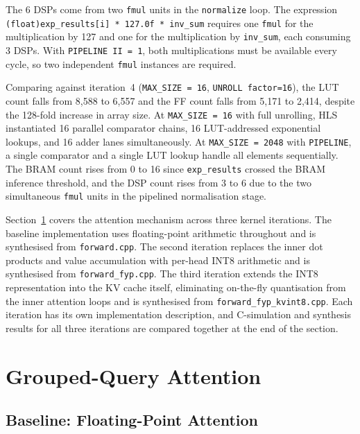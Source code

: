 The 6 DSPs come from two \texttt{fmul} units in the \texttt{normalize}
loop. The expression \texttt{(float)exp\_results[i] * 127.0f * inv\_sum}
requires one \texttt{fmul} for the multiplication by 127 and one for the
multiplication by \texttt{inv\_sum}, each consuming 3 DSPs. With
\texttt{PIPELINE II\,=\,1}, both multiplications must be available every
cycle, so two independent \texttt{fmul} instances are required.

Comparing against iteration~4 (\texttt{MAX\_SIZE\,=\,16}, \texttt{UNROLL
factor=16}), the LUT count falls from 8{,}588 to 6{,}557 and the FF
count falls from 5{,}171 to 2{,}414, despite the 128-fold increase in
array size. At \texttt{MAX\_SIZE\,=\,16} with full unrolling, HLS
instantiated 16 parallel comparator chains, 16 LUT-addressed
exponential lookups, and 16 adder lanes simultaneously. At
\texttt{MAX\_SIZE\,=\,2048} with \texttt{PIPELINE}, a single
comparator and a single LUT lookup handle all elements sequentially.
The BRAM count rises from 0 to 16 since \texttt{exp\_results} crossed
the BRAM inference threshold, and the DSP count rises from 3 to 6 due
to the two simultaneous \texttt{fmul} units in the pipelined
normalisation stage.



Section~\ref{sec:attn_impl} covers the attention mechanism across three
kernel iterations. The baseline implementation uses floating-point
arithmetic throughout and is synthesised from \texttt{forward.cpp}. The
second iteration replaces the inner dot products and value accumulation
with per-head INT8 arithmetic and is synthesised from
\texttt{forward\_fyp.cpp}. The third iteration extends the INT8
representation into the KV cache itself, eliminating on-the-fly
quantisation from the inner attention loops and is synthesised from
\texttt{forward\_fyp\_kvint8.cpp}. Each iteration has its own
implementation description, and C-simulation and synthesis results for
all three iterations are compared together at the end of the section.

\section{Grouped-Query Attention}
\label{sec:attn_impl}

\subsection{Baseline: Floating-Point Attention}
\label{subsec:attn_fp32}

